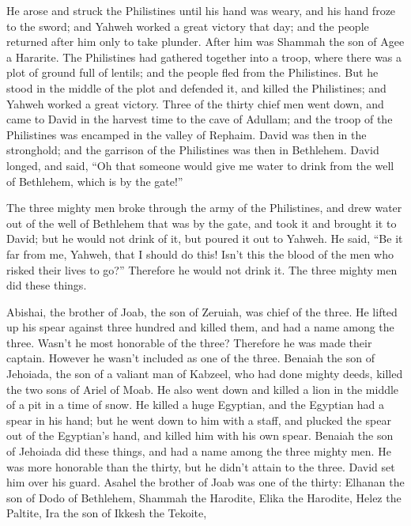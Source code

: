 {He arose and struck the Philistines until his hand was weary, and his hand froze to the sword; and Yahweh worked a great victory that day; and the people returned after him only to take plunder.
After him was Shammah the son of Agee a Hararite. The Philistines had gathered together into a troop, where there was a plot of ground full of lentils; and the people fled from the Philistines.
But he stood in the middle of the plot and defended it, and killed the Philistines; and Yahweh worked a great victory.
Three of the thirty chief men went down, and came to David in the harvest time to the cave of Adullam; and the troop of the Philistines was encamped in the valley of Rephaim.
David was then in the stronghold; and the garrison of the Philistines was then in Bethlehem.
David longed, and said, “Oh that someone would give me water to drink from the well of Bethlehem, which is by the gate!”
\par }{\PP {}The three mighty men broke through the army of the Philistines, and drew water out of the well of Bethlehem that was by the gate, and took it and brought it to David; but he would not drink of it, but poured it out to Yahweh.
He said, “Be it far from me, Yahweh, that I should do this! Isn’t this the blood of the men who risked their lives to go?” Therefore he would not drink it. The three mighty men did these things.
\par }{\PP {}Abishai, the brother of Joab, the son of Zeruiah, was chief of the three. He lifted up his spear against three hundred and killed them, and had a name among the three.
Wasn’t he most honorable of the three? Therefore he was made their captain. However he wasn’t included as one of the three.
Benaiah the son of Jehoiada, the son of a valiant man of Kabzeel, who had done mighty deeds, killed the two sons of Ariel of Moab. He also went down and killed a lion in the middle of a pit in a time of snow.
He killed a huge Egyptian, and the Egyptian had a spear in his hand; but he went down to him with a staff, and plucked the spear out of the Egyptian’s hand, and killed him with his own spear.
Benaiah the son of Jehoiada did these things, and had a name among the three mighty men.
He was more honorable than the thirty, but he didn’t attain to the three. David set him over his guard.
Asahel the brother of Joab was one of the thirty: Elhanan the son of Dodo of Bethlehem,
Shammah the Harodite, Elika the Harodite,
Helez the Paltite, Ira the son of Ikkesh the Tekoite,
}
